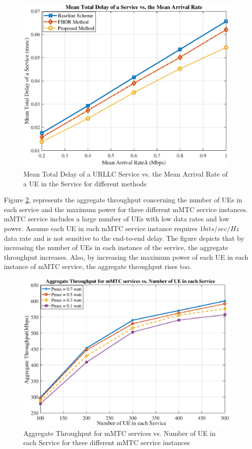 \documentclass[conference]{IEEEtran}
\begin{document}
\begin{figure}
  \centering 
    \includegraphics[scale = 0.47]{delay1_new.eps}
  \caption{Mean Total Delay of a URLLC Service vs. the Mean Arrival Rate of a UE in the Service for different methods}
  \label{fig:7}
\end{figure}

Figure \ref{fig:8}, represents the aggregate throughput concerning the number of UEs in each service and the maximum power for three different mMTC service instances. mMTC service includes a large number of UEs with low data rates and low power. 
Assume each UE in each mMTC service instance requires $1bits/sec/Hz$ data rate and is not sensitive to the end-to-end delay. The figure depicts that by increasing the number of UEs in each instance of the service, the aggregate throughput increases. Also, by increasing the maximum power of each UE in each instance of mMTC service, the aggregate throughput rises too.
\begin{figure}
    \includegraphics[scale = 0.4]{mmTCpower.eps}
  \caption{Aggregate Throughput for mMTC services vs. Number of UE in each Service for three different mMTC service instances}
  \label{fig:8}
\end{figure}
\end{document}
